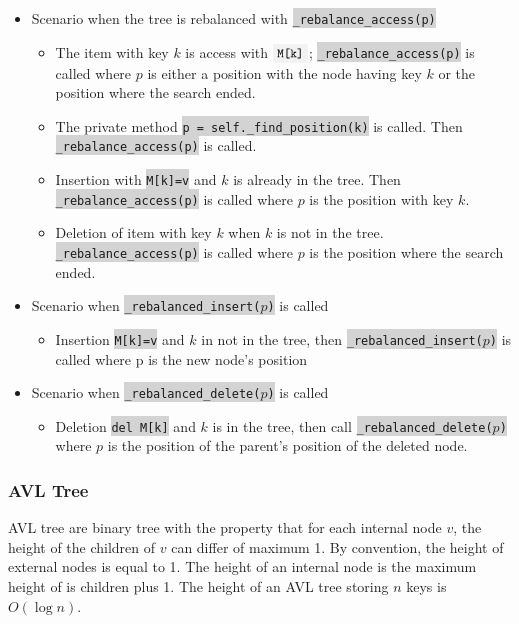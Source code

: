\documentclass[10pt]{article}
\newcommand{\code}[1]{{\small\colorbox{LightGray}{\texttt{#1}}}}
\begin{document}
\begin{itemize}
	\item Scenario when the tree is rebalanced with \code{\_rebalance\_access(p)}
	\begin{itemize}
		\item The item with key $k$ is access with $\code{M[k]}$; \code{\_rebalance\_access(p)} is called where $p$ is either a position with the node having key $k$ or the position where the search ended.
		\item The private method \code{p = self.\_find\_position(k)} is called. Then \code{\_rebalance\_access(p)} is called.
		\item Insertion with \code{M[k]=v} and $k$ is already in the tree. Then \code{\_rebalance\_access(p)} is called where $p$ is the position with key $k$.
		\item Deletion of item with key $k$ when $k$ is not in the tree. \code{\_rebalance\_access(p)} is called where $p$ is the position where the search ended.
	\end{itemize}
	\item Scenario when \code{\_rebalanced\_insert($p$)} is called
	\begin{itemize}
		\item Insertion \code{M[k]=v} and $k$ in not in the tree, then \code{\_rebalanced\_insert($p$)} is called where p is the new node's position
	\end{itemize}
	\item Scenario when \code{\_rebalanced\_delete($p$)} is called
	\begin{itemize}
		\item Deletion \code{del M[k]} and $k$ is in the tree, then call \code{\_rebalanced\_delete($p$)} where $p$ is the position of the parent's position of the deleted node.
	\end{itemize}
\end{itemize}

\subsubsection{AVL Tree}
AVL tree are binary tree with the property that for each internal node $v$, the height of the children of $v$ can differ of maximum 1. By convention, the height of external nodes is equal to 1. The height of an internal node is the maximum height of is children plus 1. The height of an AVL tree storing $n$ keys is $O(\log n)$. 
\end{document}

